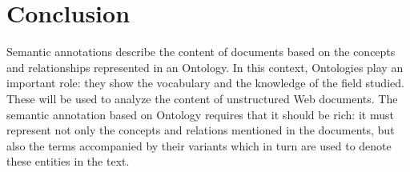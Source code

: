  
\section*{Conclusion}


Semantic annotations describe the content of documents based on the concepts and relationships represented in an Ontology. In this context, Ontologies play an important role: they show the vocabulary and the knowledge of the field studied. These will be used to analyze the content of unstructured Web documents. The semantic annotation based on Ontology requires that it should be rich: it must represent not only the concepts and relations mentioned in the documents, but also the terms accompanied by their variants which in turn are used to denote these entities in the text.